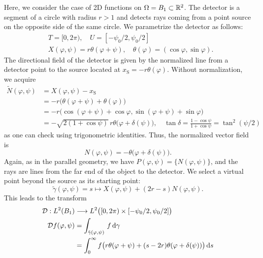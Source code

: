 \documentclass{amsart}
\renewcommand*{\phi}{\varphi}
\begin{document}
\begin{example}
 Here, we consider the case of 2D functions on $\Omega = B_1 \subset {\ensuremath{\mathbb{R}}}^2$. The detector is a segment of a circle with radius $r > 1$ and 
 detects rays coming from a point source on the opposite side of the same circle. We parametrize the detector as follows:
 \begin{align*}
  & T = [0, 2\pi),\quad U = [-\psi_0/2, \psi_0/2] \\
  & X(\phi, \psi) = r \theta(\phi + \psi), \quad \theta(\phi) = (\cos\phi, \sin\phi).
 \end{align*}
 The directional field of the detector is given by the normalized line from a detector point to the source located at 
 $x_{\mathrm{S}} = -r \theta(\phi)$. Without normalization, we acquire
 \begin{align*}
  \tilde N(\phi, \psi) 
  &= X(\phi, \psi) - x_{\mathrm{S}} \\
  &= - r \big(\theta(\phi + \psi) + \theta(\phi)\big) \\
  &= - r \big(\cos(\phi + \psi) + \cos\phi, \sin(\phi + \psi) + \sin\phi \big)\\
  &= - \sqrt{2(1 + \cos\psi)}\, r \theta\big(\phi + \delta(\psi)\big), \quad \tan\delta = \frac{1 - \cos\psi}{1 + \cos\psi} 
  = \tan^2(\psi/2)
 \end{align*}
 as one can check using trigonometric identities. Thus, the normalized vector field is
 \begin{equation}
  N(\phi, \psi) = - \theta\big(\phi + \delta(\psi)\big).
 \end{equation} 
 Again, as in the parallel geometry, we have $P(\phi,\psi) = \lbrace N(\phi,\psi)\rbrace$, and the rays are lines from the far end of 
 the object to the detector. We select a virtual point beyond the source as its starting point:
 \begin{equation*}
  \tilde \gamma(\phi, \psi) = s \mapsto X(\phi,\psi) + (2r-s) N(\phi,\psi).
 \end{equation*}
 This leads to the transform
 \begin{align}
  \OPD: L^2(B_1) &\Lto L^2\big([0,2\pi) \times [-\psi_0/2, \psi_0/2]\big)\\
  \OPD f(\phi, \psi)
  &= \int_{\tilde \gamma(\phi,\psi)}\, f \, \D \gamma \notag \\
  &= \int_0^\infty f\big(r\theta(\phi + \psi) + (s-2r)\theta(\phi + \delta(\psi))\big)\, \D s \notag \\
  \label{eq:fanbeam_fwd_op_parametr}

\end{align}
\end{example}
\end{document}
